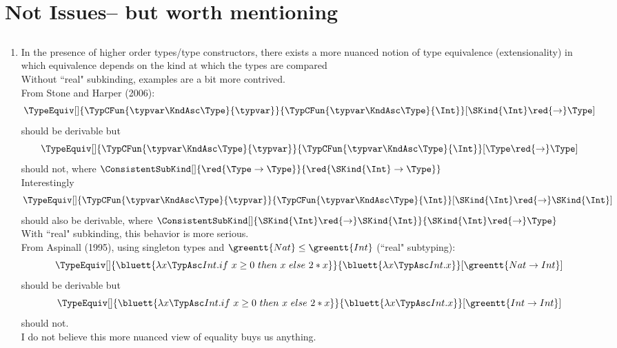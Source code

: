 \documentclass[12pt,fleqn]{article}
\begin{document}
\section{Not Issues-- but worth mentioning}
    \subsection*{}
    \begin{enumerate}[label=Nibwm \arabic*:]
        \item In the presence of higher order types/type constructors, there exists a more nuanced notion of type equivalence (extensionality) in which equivalence depends on the kind at which the types are compared \\
            Without ``real" subkinding, examples are a bit more contrived. \\
            From Stone and Harper (2006): \\
            \[
                \TypeEquiv[]{\TypCFun{\typvar\KndAsc\Type}{\typvar}}{\TypCFun{\typvar\KndAsc\Type}{\Int}}[\SKind{\Int} \red{\rightarrow} \Type]
            \]
            should be derivable but
            \[
                \TypeEquiv[]{\TypCFun{\typvar\KndAsc\Type}{\typvar}}{\TypCFun{\typvar\KndAsc\Type}{\Int}}[\Type \red{\rightarrow} \Type]
            \]
            should not, where $\ConsistentSubKind[]{\red{\Type \rightarrow \Type}}{\red{\SKind{\Int} \rightarrow \Type}}$ \\
            Interestingly
            \[
                \TypeEquiv[]{\TypCFun{\typvar\KndAsc\Type}{\typvar}}{\TypCFun{\typvar\KndAsc\Type}{\Int}}[\SKind{\Int} \red{\rightarrow} \SKind{\Int}]
            \]
            should also be derivable, where $\ConsistentSubKind[]{\SKind{\Int} \red{\rightarrow} \SKind{\Int}}{\SKind{\Int} \red{\rightarrow} \Type}$ \\
            With ``real" subkinding, this behavior is more serious. \\
            From Aspinall (1995), using singleton types and $\greentt{Nat} \le \greentt{Int}$ (``real" subtyping):
            \[
                \TypeEquiv[]{\bluett{\lambda x\TypAsc Int.if~x \ge 0~then~x~else~2*x}}{\bluett{\lambda x\TypAsc Int.x}}[\greentt{Nat \rightarrow Int}]
            \]
            should be derivable but
            \[
                \TypeEquiv[]{\bluett{\lambda x\TypAsc Int.if~x \ge 0~then~x~else~2*x}}{\bluett{\lambda x\TypAsc Int.x}}[\greentt{Int \rightarrow Int}]
            \]
            should not. \\
            I do not believe this more nuanced view of equality buys us anything.
    \end{enumerate}
\newpage
    
    
\end{document}
